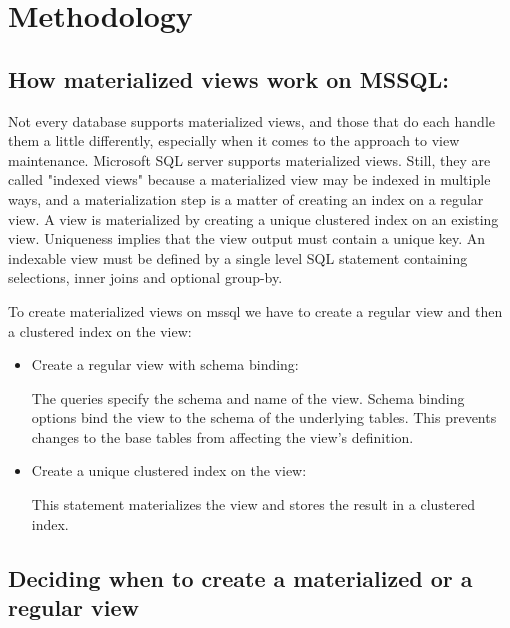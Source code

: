 \section{Methodology}\vspace{.4cm}

 \subsection{ How materialized views work on MSSQL:} Not every database supports materialized views, and those that do each handle them a little differently, especially when it comes to the approach to view maintenance.\cite{hattemer-2020} Microsoft SQL server supports materialized views. Still, they are called "indexed views" because a materialized view may be indexed in multiple ways, and a materialization step is a matter of creating an index on a regular view. A view is materialized by creating a unique clustered index on an existing view. Uniqueness implies that the view output must contain a unique key. An indexable view must be defined by a single level SQL statement containing selections, inner joins and optional group-by.\cite{goldstein-2001}\vspace{0.8cm}

 To create materialized views on mssql we have to create a  regular view and then a clustered index on the view:
 \begin{itemize}
     \item {Create a regular view with schema binding:}\vspace{0.4cm}
     

The queries specify the schema and name of the view. Schema binding options bind the view to the schema of the underlying tables. This prevents changes to the base tables from affecting the view's definition.
      \item {Create a unique clustered index on the view:}\vspace{0.4cm}
      
 \vspace{0.4cm}

This statement materializes the view and stores the result in a clustered index.
\end{itemize}



 
\subsection{Deciding when to create a materialized or a regular view}\vspace{0.4cm}

